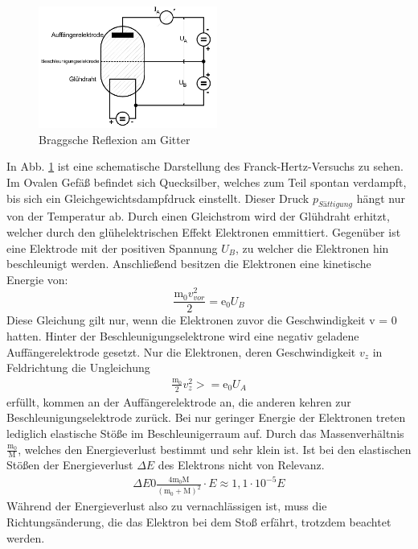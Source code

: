 \begin{figure}
    \centering
    \includegraphics[height=4.0cm]{data/abb1.jpg}
    \caption{Braggsche Reflexion am Gitter \cite{V601}}
    \label{fig:abb1}
\end{figure}
In Abb. \ref{fig:abb1} ist eine schematische Darstellung des Franck-Hertz-Versuchs zu sehen.
Im Ovalen Gefäß befindet sich Quecksilber, welches zum Teil spontan verdampft, bis sich ein Gleichgewichtsdampfdruck einstellt.
Dieser Druck $p_{Sättigung}$ hängt nur von der Temperatur ab.
Durch einen Gleichstrom wird der Glühdraht erhitzt, welcher durch den glühelektrischen Effekt Elektronen emmittiert.
Gegenüber ist eine Elektrode mit der positiven Spannung $U_B$, zu welcher die Elektronen hin beschleunigt werden.
Anschließend besitzen die Elektronen eine kinetische Energie von:
\begin{equation}
    \frac{\text{m}_0 v_{vor}^2}{2} = \text{e}_0 U_B
    \label{eqn:gl2}
\end{equation}
Diese Gleichung gilt nur, wenn die Elektronen zuvor die Geschwindigkeit v = 0 hatten.
Hinter der Beschleunigungselektrone wird eine negativ geladene Auffängerelektrode gesetzt.
Nur die Elektronen, deren Geschwindigkeit $v_z$ in Feldrichtung die Ungleichung
\begin{align*}
    \frac{\text{m}_0}{2}v_z^2 >= \text{e}_0 U_A
\end{align*}
erfüllt, kommen an der Auffängerelektrode an, die anderen kehren zur Beschleunigungselektrode zurück.
Bei nur geringer Energie der Elektronen treten lediglich elastische Stöße im Beschleunigerraum auf.
Durch das Massenverhältnis $\frac{\text{m}_0}{\text{M}}$, welches den Energieverlust bestimmt und sehr klein ist.
Ist bei den elastischen Stößen der Energieverlust $\Delta E$ des Elektrons nicht von Relevanz.
\begin{align*}
    \Delta E 0 \frac{4 \text{m}_0 \text{M}}{(\text{m}_0 + \text{M})^2} \cdot E \approx 1,1 \cdot 10^{-5} E
\end{align*}
Während der Energieverlust also zu vernachlässigen ist, muss die Richtungsänderung, die das Elektron bei dem Stoß erfährt, trotzdem beachtet werden.
